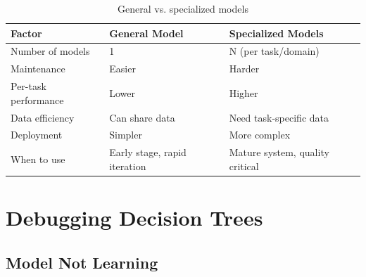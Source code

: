 \begin{table}[H]
\centering
\caption{General vs. specialized models}
\begin{tabularx}{\textwidth}{lXX}
\toprule
\textbf{Factor} & \textbf{General Model} & \textbf{Specialized Models} \\
\midrule
Number of models & 1 & N (per task/domain) \\
Maintenance & Easier & Harder \\
Per-task performance & Lower & Higher \\
Data efficiency & Can share data & Need task-specific data \\
Deployment & Simpler & More complex \\
When to use & Early stage, rapid iteration & Mature system, quality critical \\
\bottomrule
\end{tabularx}
\end{table}

\section{Debugging Decision Trees}
\label{sec:debugging_decisions}

\subsection{Model Not Learning}

